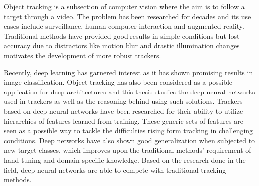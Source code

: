 
\begin{abstractpage}[english]
Object tracking is a subsection of computer vision where the aim is to follow a target through a video. The problem has been researched for decades and its use cases include surveillance, human-computer interaction and augmented reality. Traditional methods have provided good results in simple conditions but lost accuracy due to distractors like motion blur and drastic illumination changes motivates the development of more robust trackers.

Recently, deep learning has garnered interest as it has shown promising results in image classification. Object tracking has also been considered as a possible application for deep architectures and this thesis studies the deep neural networks used in trackers as well as the reasoning behind using such solutions. Trackers based on deep neural networks have been researched for their ability to utilize hierarchies of features learned from training. These generic sets of features are seen as a possible way to tackle the difficulties rising form tracking in challenging conditions. Deep networks have also shown good generalization when subjected to new target classes, which improves upon the traditional methods' requirement of hand tuning and domain specific knowledge. Based on the research done in the field, deep neural networks are able to compete with traditional tracking methods.
\end{abstractpage}

\newpage
{}

